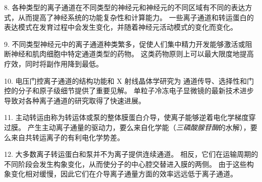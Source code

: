 8. 各种类型的离子通道在不同类型的神经元和神经元的不同区域有不同的表达方式，从而提高了神经系统的功能复杂性和计算能力。
一些离子通道和转运蛋白的表达模式在发育过程中会发生变化，并随着神经元活动模式的变化而变化。


9. 不同类型神经元中的离子通道种类繁多，促使人们集中精力开发能够激活或阻断神经和肌肉细胞中特定通道类型的药物。
这类药物原则上可以最大限度地提高疗效，同时将副作用降到最低。


10. 电压门控离子通道的结构功能和 X 射线晶体学研究为  通道传导、选择性和门控的分子和原子级细节提供了重要见解。
单粒子冷冻电子显微镜的最新技术进步导致对各种离子通道的研究取得了快速进展。


11. 主动转运由称为转运体或泵的整体膜蛋白介导，使离子能够逆着电化学梯度穿过膜。
产生主动离子通量的驱动力，要么来自化学能（\textit{三磷酸腺苷酶}的水解），要么来自共转运离子的有利电化学势差。


12. 大多数离子转运蛋白和泵并不为离子提供连续通道。
相反，它们在运输周期的不同阶段会发生构象变化，从而使分子的中心腔交替进入膜的两侧。
由于这些构象变化相对缓慢，因此它们在介导离子通量方面的效率远远低于离子通道。



